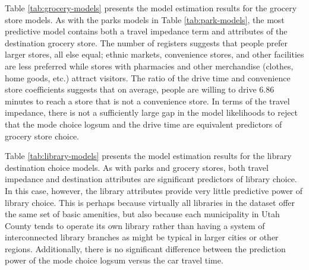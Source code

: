 \documentclass[3p, authoryear, review]{elsarticle} %
\begin{document}
Table \ref{tab:grocery-models} presents the model estimation results for the grocery
store models. As with the parks models in Table \ref{tab:park-models}, the
most predictive model contains both a travel impedance term and attributes of
the destination grocery store. The number of registers suggests that people
prefer larger stores, all else equal; ethnic markets, convenience stores, and other
facilities are less preferred while stores with pharmacies and other merchandise
(clothes, home goods, etc.) attract visitors. The ratio of the drive time and
convenience store coefficients suggests that on average, people are willing to
drive 6.86 minutes to reach a store that is not a convenience store.
In terms of the travel impedance, there is not a sufficiently large gap in the
model likelihoods to reject that the mode choice logsum and the drive
time are equivalent predictors of grocery store choice.

\begin{table}

\caption{\label{tab:library-models}Library Destination Choice Utilities}
\centering
{}
\end{table}

Table \ref{tab:library-models} presents the model estimation results for the
library destination choice models. As with parks and grocery stores, both
travel impedance and destination attributes are significant predictors of
library choice. In this case, however, the library attributes provide very little
predictive power of library choice. This is perhaps because virtually all
libraries in the dataset offer the same set of basic amenities, but also because
each municipality in Utah County tends to operate its own library rather than
having a system of interconnected library branches as might be typical in
larger cities or other regions. Additionally, there is no significant difference
between the prediction power of the mode choice logsum versus the car travel
time.
\end{document}
